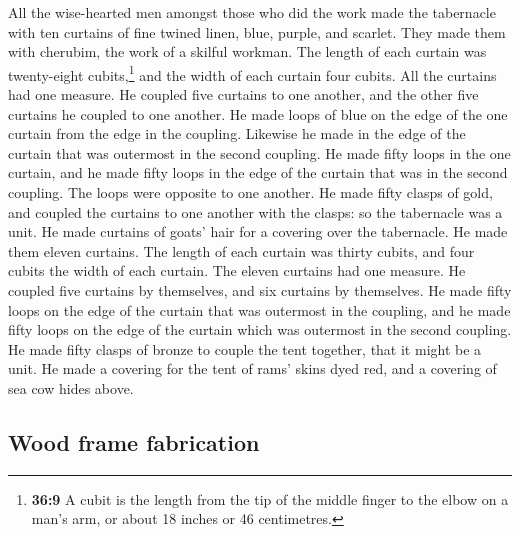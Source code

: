  All the wise-hearted men amongst those who did the work
made the tabernacle with ten curtains of fine twined linen, blue,
purple, and scarlet. They made them with cherubim, the work of a skilful
workman.  The length of each curtain was twenty-eight
cubits,\footnote{\textbf{36:9} A cubit is the length from the tip of the
  middle finger to the elbow on a man's arm, or about 18 inches or 46
  centimetres.} and the width of each curtain four cubits. All the
curtains had one measure.  He coupled five curtains to
one another, and the other five curtains he coupled to one another.
 He made loops of blue on the edge of the one curtain
from the edge in the coupling. Likewise he made in the edge of the
curtain that was outermost in the second coupling.  He
made fifty loops in the one curtain, and he made fifty loops in the edge
of the curtain that was in the second coupling. The loops were opposite
to one another.  He made fifty clasps of gold, and
coupled the curtains to one another with the clasps: so the tabernacle
was a unit.  He made curtains of goats' hair for a
covering over the tabernacle. He made them eleven curtains.
 The length of each curtain was thirty cubits, and four
cubits the width of each curtain. The eleven curtains had one measure.
 He coupled five curtains by themselves, and six curtains
by themselves.  He made fifty loops on the edge of the
curtain that was outermost in the coupling, and he made fifty loops on
the edge of the curtain which was outermost in the second coupling.
 He made fifty clasps of bronze to couple the tent
together, that it might be a unit.  He made a covering
for the tent of rams' skins dyed red, and a covering of sea cow hides
above.

\hypertarget{wood-frame-fabrication}{%
\subsection{Wood frame fabrication}\label{wood-frame-fabrication}}

